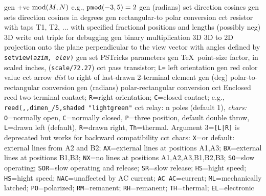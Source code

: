   {gen}
  {+ve $\hbox{mod}(M,N)$ e.g., $\hbox{\tt pmod}(-3,5)=2$}
  {gen}
  {(radians) set direction cosines}
  {gen}
  {sets direction cosines in degrees }
  {gen}
  {rectangular-to polar conversion}
  {cct}
  {resistor with taps T1, T2, $\ldots$
    with specified fractional positions and lengths (possibly neg) 
   }
  {3D}
  {write out triple for debugging}
  {gen}
  {binary multiplication}
  {3D}
  {3D to 2D projection onto the plane perpendicular to the view vector with
   angles defined by {\tt setview({\sl azim, elev})}}
  {gen}
  {set PSTricks parameters}
  {gen}
  {\TeX\ point-size factor, in scaled inches, ({\tt *scale/72.27})}
  {cct}
  {pass transistor; {\tt L=} left orientation
    }
  {gen}
  {red color value}
  {cct}
  {arrow {\sl dist} to right of last-drawn 2-terminal element
   }
  {gen}
  {(deg) polar-to-rectangular conversion}
  {gen}
  {(radians) polar-rectangular conversion}
  {cct}
  {Enclosed reed two-terminal contact;
   {\tt R}=right orientation; {\tt C}=closed contact;
   e.g., {\tt reed(,,dimen\_/5,shaded "lightgreen"}
   }
  {cct}
  {relay: n poles (default 1), {\sl chars:} {\tt O}=normally open,
    {\tt C}=normally closed, {\tt P}=three position, default double throw,
    {\tt L}=drawn left (default),
    {\tt R}=drawn right, {\tt Th}=thermal.
    Argument 3={\tt [L|R]} is deprecated but works for
    backward compatibility
   }
  {cct}
  {chars: 
    {\tt X}=or default: external lines from A2 and B2;
    {\tt AX}=external lines at positions A1,A3;
    {\tt BX}=external lines at positions B1,B3;
    {\tt NX}=no lines at positions A1,A2,A3,B1,B2,B3;
    {\tt SO}=slow operating;
    {\tt SOR}=slow operating and release;
    {\tt SR}=slow release;
    {\tt HS}=hight speed;
    {\tt HS}=hight speed;
    {\tt NAC}=unaffected by AC current;
    {\tt AC AC}=current;
    {\tt ML}=mechanically latched;
    {\tt PO}=polarized;
    {\tt RM}=remanent;
    {\tt RH}=remanent;
    {\tt TH}=thermal;
    {\tt EL}=electronic
   }
